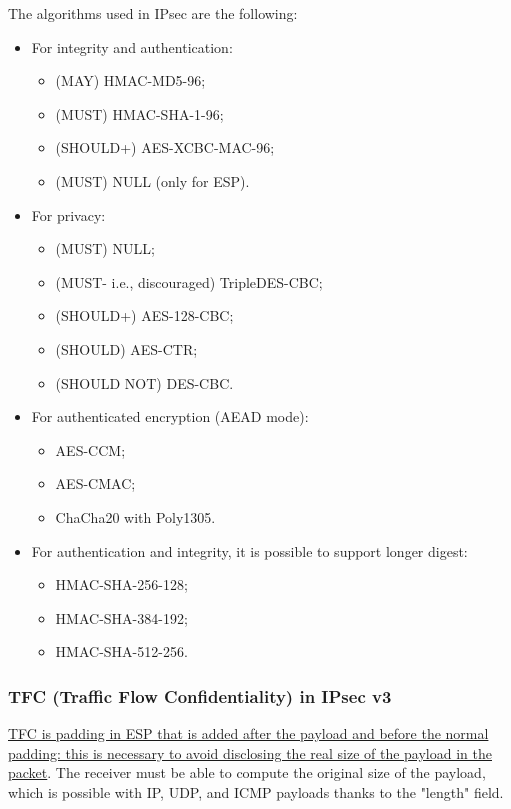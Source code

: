 The algorithms used in IPsec are the following:
\begin{itemize}
	\item For integrity and authentication:
	      \begin{itemize}
		      \item (MAY) HMAC-MD5-96;
		      \item (MUST) HMAC-SHA-1-96;
		      \item (SHOULD+) AES-XCBC-MAC-96;
		      \item (MUST) NULL (only for ESP).
	      \end{itemize}

	\item For privacy:
	      \begin{itemize}
		      \item (MUST) NULL;
		      \item (MUST- i.e., discouraged) TripleDES-CBC;
		      \item (SHOULD+) AES-128-CBC;
		      \item (SHOULD) AES-CTR;
		      \item (SHOULD NOT) DES-CBC.
	      \end{itemize}

	\item For authenticated encryption (AEAD mode):
	      \begin{itemize}
		      \item AES-CCM;
		      \item AES-CMAC;
		      \item ChaCha20 with Poly1305.
	      \end{itemize}

	\item For authentication and integrity, it is possible to support longer digest:
	      \begin{itemize}
		      \item HMAC-SHA-256-128;
		      \item HMAC-SHA-384-192;
		      \item HMAC-SHA-512-256.
	      \end{itemize}
\end{itemize}


\subsubsection{TFC (Traffic Flow Confidentiality) in IPsec v3}
\ul{TFC is padding in ESP that is added after the payload and before the normal padding: this is necessary to avoid disclosing the real size of the payload in the packet}. The receiver must be able to compute the original size of the payload, which is possible with IP, UDP, and ICMP payloads thanks to the "length" field.

